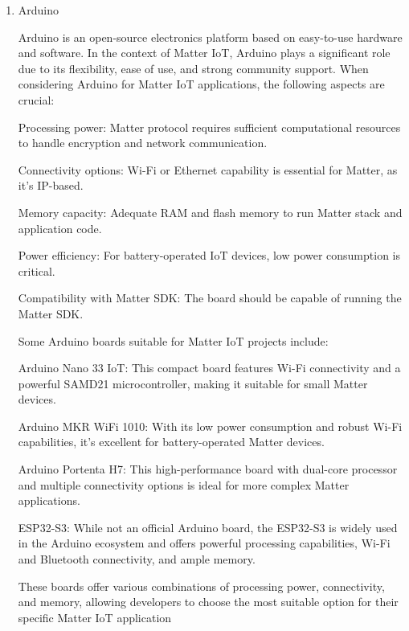 \documentclass[conference]{IEEEtran}
\begin{document}
\begin{enumerate}[itemsep=2ex, parsep=1ex]
	\item Arduino
	      	      	      
	      Arduino is an open-source electronics platform based on easy-to-use hardware and software. In the context of Matter IoT, Arduino plays a significant role due to its flexibility, ease of use, and strong community support. When considering Arduino for Matter IoT applications, the following aspects are crucial:
	      	      	          
	      Processing power: Matter protocol requires sufficient computational resources to handle encryption and network communication.
	      	      	          
	      Connectivity options: Wi-Fi or Ethernet capability is essential for Matter, as it's IP-based.
	      	      	          
	      Memory capacity: Adequate RAM and flash memory to run Matter stack and application code.
	      	      	          
	      Power efficiency: For battery-operated IoT devices, low power consumption is critical.
	      	      	          
	      Compatibility with Matter SDK: The board should be capable of running the Matter SDK.
	      	      	          
	      Some Arduino boards suitable for Matter IoT projects include:
	      	      	          
	      Arduino Nano 33 IoT: This compact board features Wi-Fi connectivity and a powerful SAMD21 microcontroller, making it suitable for small Matter devices.
	      	      	          
	      Arduino MKR WiFi 1010: With its low power consumption and robust Wi-Fi capabilities, it's excellent for battery-operated Matter devices.
	      	      	          
	      Arduino Portenta H7: This high-performance board with dual-core processor and multiple connectivity options is ideal for more complex Matter applications.
	      	      	      
	      ESP32-S3: While not an official Arduino board, the ESP32-S3 is widely used in the Arduino ecosystem and offers powerful processing capabilities, Wi-Fi and Bluetooth connectivity, and ample memory.
	      	      	          
	      These boards offer various combinations of processing power, connectivity, and memory, allowing developers to choose the most suitable option for their specific Matter IoT application
	      	      	          

\end{enumerate}
\end{document}
